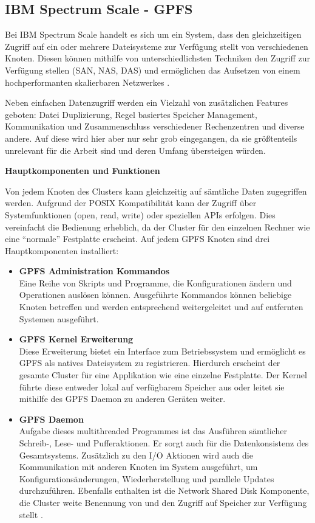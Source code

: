 \subsection{IBM Spectrum Scale - GPFS}

Bei IBM Spectrum Scale handelt es sich um ein System, dass den gleichzeitigen Zugriff auf ein oder mehrere Dateisysteme zur Verfügung stellt von verschiedenen Knoten. Diesen können mithilfe von unterschiedlichsten Techniken den Zugriff zur Verfügung stellen (SAN, NAS, DAS) und ermöglichen das Aufsetzen von einem hochperformanten skalierbaren Netzwerkes \parencite[S. 1]{ibm.2017}.

Neben einfachen Datenzugriff werden ein Vielzahl von zusätzlichen Features geboten: Datei Duplizierung, Regel basiertes Speicher Management, Kommunikation und Zusammenschluss verschiedener Rechenzentren und diverse andere. Auf diese wird hier aber nur sehr grob eingegangen, da sie größtenteils unrelevant für die Arbeit sind und deren Umfang übersteigen würden.

\textbf{Hauptkomponenten und Funktionen}

Von jedem Knoten des Clusters kann gleichzeitig auf sämtliche Daten zugegriffen werden. Aufgrund der \gls{POSIX} Kompatibilität kann der Zugriff über Systemfunktionen (open, read, write) oder speziellen APIs erfolgen. Dies vereinfacht die Bedienung erheblich, da der Cluster für den einzelnen Rechner wie eine ``normale'' Festplatte erscheint. Auf jedem GPFS Knoten sind drei Hauptkomponenten installiert:

\begin{itemize}
	\item \textbf{GPFS Administration Kommandos} \\
	Eine Reihe von Skripts und Programme, die Konfigurationen ändern und Operationen auslösen können. Ausgeführte Kommandos können beliebige Knoten betreffen und werden entsprechend weitergeleitet und auf entfernten Systemen ausgeführt.
	\item \textbf{GPFS Kernel Erweiterung} \\
	Diese Erweiterung bietet ein Interface zum Betriebssystem und ermöglicht es GPFS als natives Dateisystem zu registrieren. Hierdurch erscheint der gesamte Cluster für eine Applikation wie eine einzelne Festplatte. Der Kernel führte diese entweder lokal auf verfügbarem Speicher aus oder leitet sie mithilfe des GPFS Daemon zu anderen Geräten weiter.
	\item \textbf{GPFS Daemon} \\
	Aufgabe dieses multithreaded Programmes ist das Ausführen sämtlicher Schreib-, Lese- und Pufferaktionen. Er sorgt auch für die Datenkonsistenz des Gesamtsystems. Zusätzlich zu den I/O Aktionen wird auch die Kommunikation mit anderen Knoten im System ausgeführt, um Konfigurationsänderungen, Wiederherstellung und parallele Updates durchzuführen.
	Ebenfalls enthalten ist die Network Shared Disk Komponente, die Cluster weite Benennung von und den Zugriff auf Speicher zur Verfügung stellt \parencite[S. 6]{ibm.2017}.  
\end{itemize} 

